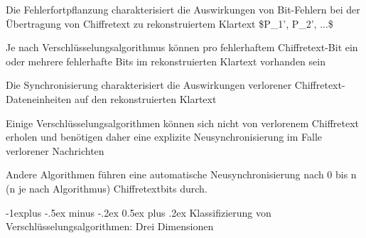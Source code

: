 \documentclass[a4paper]{article}
\makeatletter
\renewcommand{\subsection}{\@startsection{subsection}{2}{0mm}%
 {-1explus -.5ex minus -.2ex}%
 {0.5ex plus .2ex}%
 {\normalfont\normalsize\bfseries}}
\makeatother
\begin{document}
\begin{multicols}{3}
      \begin{itemize*}
            \item Die Fehlerfortpflanzung charakterisiert die Auswirkungen von
            Bit-Fehlern bei der Übertragung von Chiffretext zu rekonstruiertem
            Klartext \$P\_1', P\_2', ...\$
            \begin{itemize*}
                  \item Je nach Verschlüsselungsalgorithmus können pro fehlerhaftem Chiffretext-Bit ein oder mehrere fehlerhafte Bits im rekonstruierten Klartext vorhanden sein
            \end{itemize*}
            \item Die Synchronisierung charakterisiert die Auswirkungen verlorener
            Chiffretext-Dateneinheiten auf den rekonstruierten Klartext
            \begin{itemize*}
                  \item Einige Verschlüsselungsalgorithmen können sich nicht von verlorenem Chiffretext erholen und benötigen daher eine explizite Neusynchronisierung im Falle verlorener Nachrichten
                  \item Andere Algorithmen führen eine automatische Neusynchronisierung nach 0 bis n (n je nach Algorithmus) Chiffretextbits durch.
            \end{itemize*}
      \end{itemize*}


      \subsection{Klassifizierung von Verschlüsselungsalgorithmen: Drei
            Dimensionen}


\end{multicols}
\end{document}
